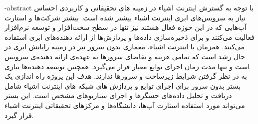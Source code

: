 
\fa-abstract{
\fontsize{12pt}{18pt}\selectfont
با توجه به گسترش اینترنت اشیاء در زمینه های تحقیقاتی و کاربردی احساس نیاز به سرویس‌های ابری اینترنت اشیاء بیشتر شده است.  بیشتر شرکت‌ها و استارت آپ‌هایی که در این حوزه فعال هستند نیز تنها در سطح سخت‌افزار و توسعه نرم‌افزار فعالیت می‌کنند و برای ذخیره‌سازی داده‌ها و پردازش‌ها از ارائه دهنده‌های ابری استفاده می‌کنند.
همزمان با اینترنت اشیاء، معماری بدون سرور نیز در زمینه رایانش ابری در حال رشد است که تمامی هزینه و تقاضای سرورها به عهده‌ی ارائه دهنده‌ی سرویس است و تنها مدت زمان اجرای توابع معیار قرار می‌گیرد. همچنین توسعه دهنده‌ها نیازی به در نظر گرفتن شرايط زيرساخت و سرورها ندارند. هدف این پروژه راه اندازی یک بستر بدون سرور برای اجرای توابع و پردازش های شبکه های اینترنت اشیاء شامل دریافت و تحلیل داده‌های حسگرها و اجرای سناریوهای مشخص است. این بستر می‌تواند مورد استفاده استارت آپ‌ها، دانشگاه‌ها و مرکزهای تحقیقاتی اینترنت اشیاء قرار‌ گیرد.
}





\AUTtitle

